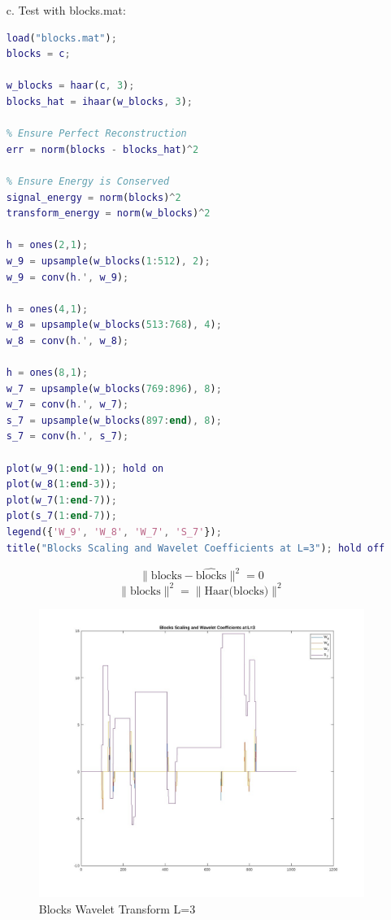 \documentclass[12pt]{article}
\begin{document}
\begin{enumerate}
\begin{enumerate}
\newpage

\item[c.] Test with blocks.mat:
\begin{lstlisting}[language=matlab]
load("blocks.mat");
blocks = c;

w_blocks = haar(c, 3);
blocks_hat = ihaar(w_blocks, 3);

% Ensure Perfect Reconstruction
err = norm(blocks - blocks_hat)^2

% Ensure Energy is Conserved
signal_energy = norm(blocks)^2
transform_energy = norm(w_blocks)^2

h = ones(2,1);
w_9 = upsample(w_blocks(1:512), 2);
w_9 = conv(h.', w_9);

h = ones(4,1);
w_8 = upsample(w_blocks(513:768), 4);
w_8 = conv(h.', w_8);

h = ones(8,1);
w_7 = upsample(w_blocks(769:896), 8);
w_7 = conv(h.', w_7);
s_7 = upsample(w_blocks(897:end), 8);
s_7 = conv(h.', s_7);

plot(w_9(1:end-1)); hold on
plot(w_8(1:end-3));
plot(w_7(1:end-7));
plot(s_7(1:end-7)); 
legend({'W_9', 'W_8', 'W_7', 'S_7'}); 
title("Blocks Scaling and Wavelet Coefficients at L=3"); hold off
\end{lstlisting}

\begin{framed}
    \[\|\text{blocks}-\hat{\text{blocks}}\|^2 = 0\]
    \[\|\text{blocks}\|^2 = \|\text{Haar(blocks)}\|^2\]
\end{framed}

\begin{figure}[!ht]
    \caption{Blocks Wavelet Transform L=3}
    \centering
    \includegraphics[scale=0.4]{6-2b.jpg}
\end{figure}




\end{enumerate}
\end{enumerate}
\end{document}
